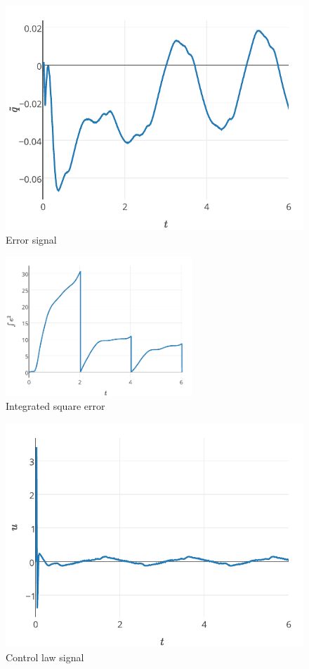 \documentclass[journal]{IEEEtran}
\begin{document}
\begin{figure}[!t]
    \centering
    \includegraphics[width=\textwidth]{error}
    \caption{Error signal}
    \label{fig_error}
\end{figure}

\begin{figure}[!t]
    \centering
    \includegraphics[width=7cm]{IEC}
    \caption{Integrated square error}
    \label{fig_iec}
\end{figure}

\begin{figure}[!t]
    \centering
    \includegraphics[width=\textwidth]{control}
    \caption{Control law signal}
    \label{fig_control}
\end{figure}
\end{document}
